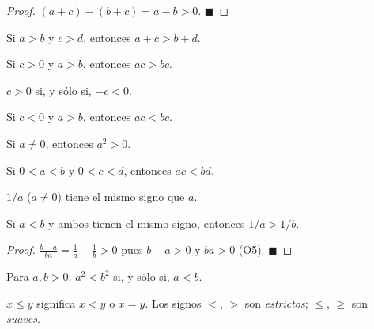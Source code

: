 \documentclass[12pt]{article}
\begin{document}
\begin{proof}
$(a+c) - (b+c) = a - b > 0$.
$\blacksquare$
\end{proof}

\begin{proposicion}[3]{}
Si $a > b$ y $c > d$, entonces $a + c > b + d$.
\end{proposicion}

\begin{proposicion}[4]{}
Si $c > 0$ y $a > b$, entonces $ac > bc$.
\end{proposicion}

\begin{proposicion}[5]{}
$c > 0$ si, y sólo si, $-c < 0$.
\end{proposicion}

\begin{proposicion}[6]{}
Si $c < 0$ y $a > b$, entonces $ac < bc$.
\end{proposicion}

\begin{proposicion}[7]{}
Si $a \neq 0$, entonces $a^2 > 0$.
\end{proposicion}

\begin{proposicion}[8]{}
Si $0 < a < b$ y $0 < c < d$, entonces $ac < bd$.
\end{proposicion}

\begin{proposicion}[9]{}
$1/a$ ($a \neq 0$) tiene el mismo signo que $a$.
\end{proposicion}

\begin{proposicion}[10]{}
Si $a < b$ y ambos tienen el mismo signo, entonces $1/a > 1/b$.
\end{proposicion}

\begin{proof}
$\tfrac{b-a}{ba} = \tfrac{1}{a} - \tfrac{1}{b} > 0$ pues $b - a > 0$ y $ba > 0$ (O5).
$\blacksquare$
\end{proof}

\begin{proposicion}[11]{}
Para $a, b > 0$: $a^2 < b^2$ si, y sólo si, $a < b$.
\end{proposicion}

\begin{nota}[]{}
$x \leq y$ significa $x < y$ o $x = y$. Los signos $<$, $>$ son \textit{estrictos}; $\leq$, $\geq$ son \textit{suaves}.
\end{nota}
\end{document}
